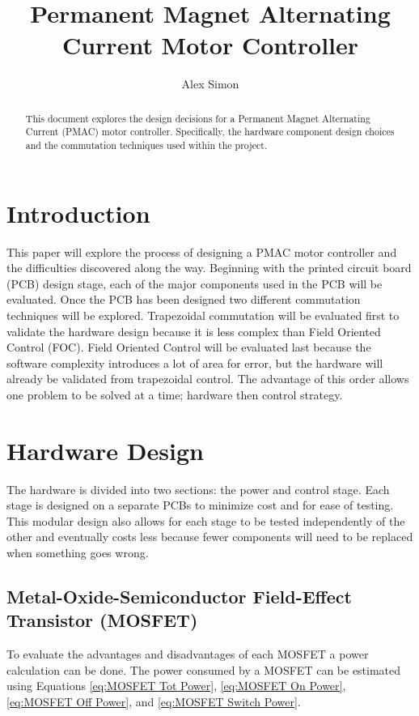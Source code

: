 \documentclass{article}
\begin{document}
	
	\title{Permanent Magnet Alternating Current Motor Controller}
	\author{Alex Simon}
	
	\maketitle
	
	\begin{abstract}
		This document explores the design decisions for a Permanent Magnet Alternating Current (PMAC) motor controller.  Specifically, the hardware component design choices and the commutation techniques used within the project.
	\end{abstract}
	
	\section{Introduction}
	This paper will explore the process of designing a PMAC motor controller and the difficulties discovered along the way.  Beginning with the printed circuit board (PCB) design stage, each of the major components used in the PCB will be evaluated.  Once the PCB has been designed two different commutation techniques will be explored.  Trapezoidal commutation will be evaluated first to validate the hardware design because it is less complex than Field Oriented Control (FOC).  Field Oriented Control will be evaluated last because the software complexity introduces a lot of area for error, but the hardware will already be validated from trapezoidal control.  The advantage of this order allows one problem to be solved at a time; hardware then control strategy.
	
	\section{Hardware Design}
	The hardware is divided into two sections: the power and control stage.  Each stage is designed on a separate PCBs to minimize cost and for ease of testing.  This modular design also allows for each stage to be tested independently of the other and eventually costs less because fewer components will need to be replaced when something goes wrong.
	
		\subsection{Metal-Oxide-Semiconductor Field-Effect Transistor (MOSFET)}
		To evaluate the advantages and disadvantages of each MOSFET a power calculation can be done.  The power consumed by a MOSFET can be estimated using Equations \ref{eq:MOSFET Tot Power}, \ref{eq:MOSFET On Power}, \ref{eq:MOSFET Off Power}, and \ref{eq:MOSFET Switch Power}.
		
\end{document}
